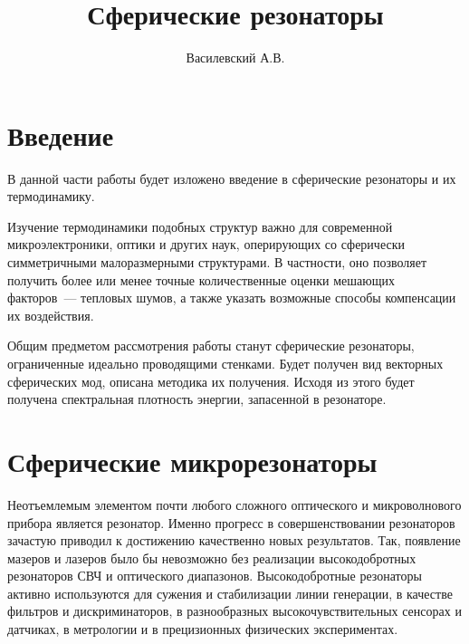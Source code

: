 \documentclass[12pt,a4paper]{article}
\title{Сферические резонаторы}
\author{Василевский А.В.}
\begin{document}
    \maketitle
    \tableofcontents


    \section*{Введение}

        В данной части работы будет изложено введение в сферические резонаторы и их термодинамику.

        Изучение термодинамики подобных структур важно для современной микроэлектроники, оптики и других наук, оперирующих со сферически симметричными малоразмерными структурами. В частности, оно позволяет получить более или менее точные количественные оценки мешающих факторов~--- тепловых шумов, а также указать возможные способы компенсации их воздействия.

        Общим предметом рассмотрения работы станут сферические резонаторы, ограниченные идеально проводящими стенками. Будет получен вид векторных сферических мод, описана методика их получения. Исходя из этого будет получена спектральная плотность энергии, запасенной в резонаторе.


    \section{Сферические микрорезонаторы}

        Неотъемлемым элементом почти любого сложного оптического и микроволнового прибора является резонатор. Именно прогресс в совершенствовании резонаторов зачастую приводил к достижению качественно новых результатов. Так, появление мазеров и лазеров было бы невозможно без реализации высокодобротных резонаторов СВЧ и оптического диапазонов. Высокодобротные резонаторы активно используются для сужения и стабилизации линии генерации, в качестве фильтров и дискриминаторов, в разнообразных высокочувствительных сенсорах и датчиках, в метрологии и в прецизионных физических экспериментах. \cite{microresonators}
\end{document}
